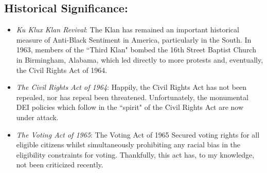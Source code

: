 \documentclass{article}
\begin{document}
\subsection*{Historical Significance:}

  \begin{itemize}
    \item \textit{Ku Klux Klan Revival}: The Klan has remained an important historical 
    measure of Anti-Black Sentiment in America, particularly in the South. In 1963, 
    members of the ``Third Klan" bombed the 16th Street Baptist Church in Birmingham, 
    Alabama, which led directly to more protests and, eventually, the Civil Rights Act 
    of 1964.
    \item \textit{The Civil Rights Act of 1964}: Happily, the Civil Rights Act has not 
    been repealed, nor has repeal been threatened. Unfortunately, the monumental DEI 
    policies which follow in the ``spirit" of the Civil Rights Act are now under attack.
    \item \textit{The Voting Act of 1965}: The Voting Act of 1965 Secured voting rights 
    for all eligible citizens whilst simultaneously prohibiting any racial bias in 
    the eligibility constraints for voting. Thankfully, this act has, to my knowledge, 
    not been criticized recently. 
  \end{itemize}
\end{document}
